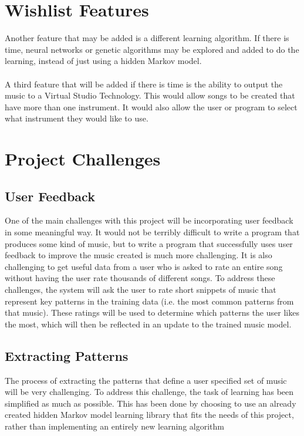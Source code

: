 \documentclass{article}
\begin{document}
\section{Wishlist Features}
Another feature that may be added is a different learning algorithm. If there is time, neural networks or genetic algorithms may be explored and added to do the learning, instead of just using a hidden Markov model.\\
\\
A third feature that will be added if there is time is the ability to output the music to a Virtual Studio Technology. This would allow songs to be created that have more than one instrument. It would also allow the user or program to select what instrument they would like to use.

\section{Project Challenges}
\subsection{User Feedback}
One of the main challenges with this project will be incorporating user feedback in some meaningful way. It would not be terribly difficult to write a program that produces some kind of music, but to write a program that successfully uses user feedback to improve the music created is much more challenging. It is also challenging to get useful data from a user who is asked to rate an entire song without having the user rate thousands of different songs. To address these challenges, the system will ask the user to rate short snippets of music that represent key patterns in the training data (i.e. the most common patterns from that music). These ratings will be used to determine which patterns the user likes the most, which will then be reflected in an update to the trained music model.

\subsection{Extracting Patterns}
The process of extracting the patterns that define a user specified set of music will be very challenging. To address this challenge, the task of learning has been simplified as much as possible. This has been done by choosing to use an already created hidden Markov model learning library that fits the needs of this project, rather than implementing an entirely new learning algorithm

\nocite{*}





\end{document}
